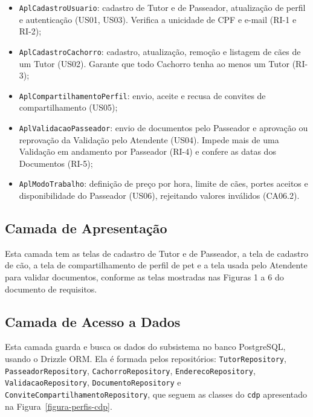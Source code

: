 \begin{itemize}
	\item \texttt{AplCadastroUsuario}: cadastro de Tutor e de Passeador, atualização de perfil e autenticação (US01, US03). Verifica a unicidade de CPF e e-mail (RI-1 e RI-2);
	\item \texttt{AplCadastroCachorro}: cadastro, atualização, remoção e listagem de cães de um Tutor (US02). Garante que todo Cachorro tenha ao menos um Tutor (RI-3);
	\item \texttt{AplCompartilhamentoPerfil}: envio, aceite e recusa de convites de compartilhamento (US05);
	\item \texttt{AplValidacaoPasseador}: envio de documentos pelo Passeador e aprovação ou reprovação da Validação pelo Atendente (US04). Impede mais de uma Validação em andamento por Passeador (RI-4) e confere as datas dos Documentos (RI-5);
	\item \texttt{AplModoTrabalho}: definição de preço por hora, limite de cães, portes aceitos e disponibilidade do Passeador (US06), rejeitando valores inválidos (CA06.2).
\end{itemize}


\subsection{Camada de Apresentação}
\label{sec-componentes-perfis-apresentacao}

Esta camada tem as telas de cadastro de Tutor e de Passeador, a tela de cadastro de cão, a tela de compartilhamento de perfil de pet e a tela usada pelo Atendente para validar documentos, conforme as telas mostradas nas Figuras 1 a 6 do documento de requisitos.


\subsection{Camada de Acesso a Dados}
\label{sec-componentes-perfis-dados}

\begin{sloppypar}
Esta camada guarda e busca os dados do subsistema no banco PostgreSQL, usando o Drizzle ORM. Ela é formada pelos repositórios: \texttt{TutorRepository}, \texttt{PasseadorRepository}, \texttt{CachorroRepository}, \texttt{EnderecoRepository}, \texttt{ValidacaoRepository}, \texttt{DocumentoRepository} e \texttt{ConviteCompartilhamento\-Repository}, que seguem as classes do \texttt{cdp} apresentado na Figura~\ref{figura-perfis-cdp}.
\end{sloppypar}



